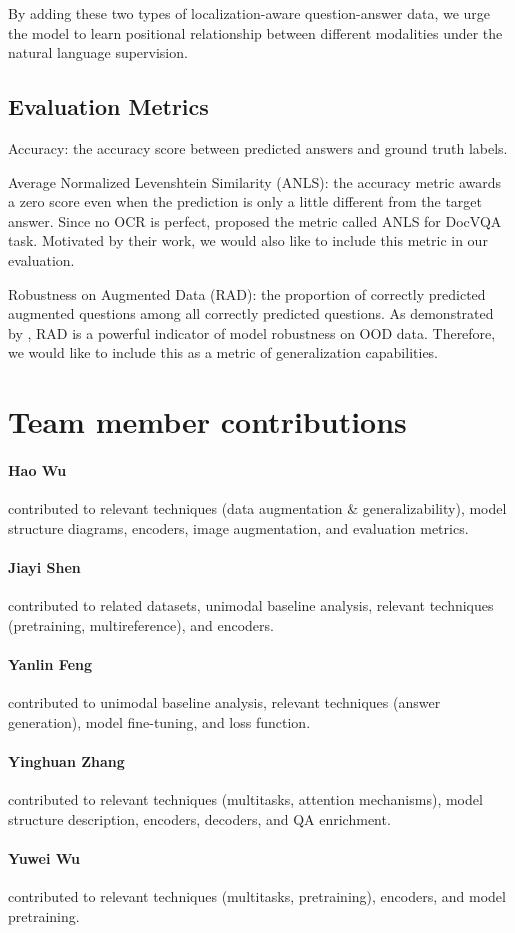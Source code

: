 \documentclass[11pt,a4paper]{article}
\begin{document}
By adding these two types of localization-aware question-answer data, we urge the model to learn positional relationship between different modalities under the natural language supervision.

\subsection{Evaluation Metrics}
Accuracy: the accuracy score between predicted answers and ground truth labels.

Average Normalized Levenshtein Similarity (ANLS): the accuracy metric awards a zero score even when the prediction is only a little different from the target answer. Since no OCR is perfect, \citet{mathew2021docvqa} proposed the metric called ANLS for DocVQA task. Motivated by their work, we would also like to include this metric in our evaluation.

Robustness on Augmented Data (RAD): the proportion of correctly predicted augmented questions among all correctly predicted questions. As demonstrated by \citet{RAD}, RAD is a powerful indicator of model robustness on OOD data. Therefore, we would like to include this as a metric of generalization capabilities.  


\section{Team member contributions}
\paragraph{Hao Wu} contributed to relevant techniques (data augmentation & generalizability), model structure diagrams, encoders, image augmentation, and evaluation metrics.

\paragraph{Jiayi Shen} contributed to related datasets, unimodal baseline analysis, relevant techniques (pretraining, multireference), and encoders.

\paragraph{Yanlin Feng} contributed to unimodal baseline analysis, relevant techniques (answer generation), model fine-tuning, and loss function.

\paragraph{Yinghuan Zhang} contributed to relevant techniques (multitasks, attention mechanisms), model structure description, encoders, decoders, and QA enrichment.

\paragraph{Yuwei Wu} contributed to relevant techniques (multitasks, pretraining), encoders, and model pretraining.

\clearpage



\end{document}
